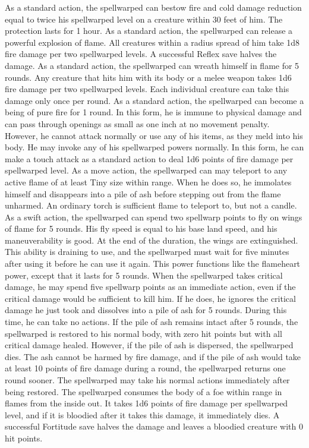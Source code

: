  As a standard action, the spellwarped can bestow fire and cold damage reduction equal to twice his spellwarped level on a creature within 30 feet of him. The protection lasts for 1 hour.
 As a standard action, the spellwarped can release a powerful explosion of flame. All creatures within a \areamed radius spread of him take 1d8 fire damage per two spellwarped levels. A successful Reflex save halves the damage.
 As a standard action, the spellwarped can wreath himself in flame for 5 rounds. Any creature that hits him with its body or a melee weapon takes 1d6 fire damage per two spellwarped levels. Each individual creature can take this damage only once per round.
 As a standard action, the spellwarped can become a being of pure fire for 1 round. In this form, he is immune to physical damage and can pass through openings as small as one inch at no movement penalty. However, he cannot attack normally or use any of his items, as they meld into his body. He may invoke any of his spellwarped powers normally. In this form, he can make a touch attack as a standard action to deal 1d6 points of fire damage per spellwarped level.
 As a move action, the spellwarped can may teleport to any active flame of at least Tiny size within \rngmed range. When he does so, he immolates himself and disappears into a pile of ash before stepping out from the flame unharmed. An ordinary torch is sufficient flame to teleport to, but not a candle.
 As a swift action, the spellwarped can spend two spellwarp points to fly on wings of flame for 5 rounds. His fly speed is equal to his base land speed, and his maneuverability is good. At the end of the duration, the wings are extinguished. This ability is draining to use, and the spellwarped must wait for five minutes after using it before he can use it again.
 This power functions like the flameheart power, except that it lasts for 5 rounds.
 When the spellwarped takes critical damage, he may spend five spellwarp points as an immediate action, even if the critical damage would be sufficient to kill him. If he does, he ignores the critical damage he just took and dissolves into a pile of ash for 5 rounds. During this time, he can take no actions. If the pile of ash remains intact after 5 rounds, the spellwarped is restored to his normal body, with zero hit points but with all critical damage healed. However, if the pile of ash is dispersed, the spellwarped dies. The ash cannot be harmed by fire damage, and if the pile of ash would take at least 10 points of fire damage during a round, the spellwarped returns one round sooner. The spellwarped may take his normal actions immediately after being restored.
 The spellwarped consumes the body of a foe within \rngclose range in flames from the inside out. It takes 1d6 points of fire damage per spellwarped level, and if it is bloodied after it takes this damage, it immediately dies. A successful Fortitude save halves the damage and leaves a bloodied creature with 0 hit points.

